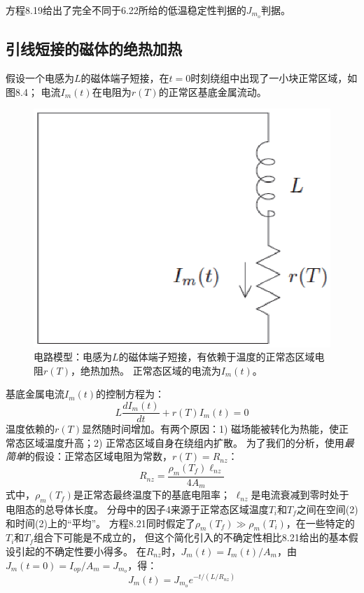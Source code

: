 方程8.19给出了完全不同于6.22所给的低温稳定性判据的$J_{m_o}$判据。

\subsection{引线短接的磁体的绝热加热}
假设一个电感为$L$的磁体端子短接，在$t=0$时刻绕组中出现了一小块正常区域，如图8.4；
电流$I_m(t)$在电阻为$r(T)$的正常区基底金属流动。
\begin{figure}
	\centering
	\includegraphics[scale=0.5]{chpt8/figs/fig8.4.eps}
	\caption{电路模型：电感为$L$的磁体端子短接，有依赖于温度的正常态区域电阻$r(T)$，绝热加热。
	正常态区域的电流为$I_m(t)$。}
\end{figure}

基底金属电流$I_m(t)$的控制方程为：
\begin{equation}%
L\frac{dI_m(t)}{dt}+r(T)I_m(t)=0
\end{equation}
温度依赖的$r(T)$显然随时间增加。有两个原因：1) 磁场能被转化为热能，使正常态区域温度升高；2)
正常态区域自身在绕组内扩散。
为了我们的分析，使用\textit{最简单}的假设：正常态区域电阻为常数，$r(T)=R_{nz}$：
\begin{equation}%
R_{nz}=\frac{\rho_m(T_f)\ell_{nz}}{4A_m}
\end{equation}
式中，$\rho_m(T_f)$是正常态最终温度下的基底电阻率；
$\ell_{nz}$是电流衰减到零时处于电阻态的总导体长度。
分母中的因子4来源于正常态区域温度$T_i$和$T_f$之间在空间(2)和时间(2)上的“平均”。
方程8.21同时假定了$\rho_m(T_f)\gg \rho_m(T_i)$，在一些特定的$T_i$和$T_f$组合下可能是不成立的，
但这个简化引入的不确定性相比8.21给出的基本假设引起的不确定性要小得多。
在$R_{nz}$时，$J_m(t)=I_m(t)/A_m$，由$J_m(t=0)=I_{op}/A_m=J_{m_o}$，得：
\begin{equation}%
J_m(t)=J_{m_o}e^{-t/(L/R_{nz})}
\end{equation}


